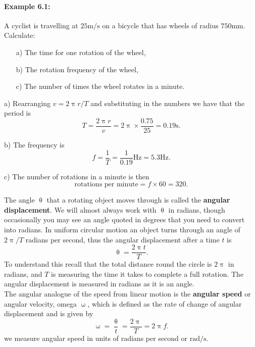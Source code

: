 \documentclass[a4paper,12pt]{book}
\begin{document}
\paragraph{Example 6.1:} A cyclist is travelling at $25\text{m/s}$ on a bicycle that has wheels of radius $750 \text{mm}$. Calculate:
\begin{itemize}
\setlength{\itemsep}{-5pt}
    \item[a)] The time for one rotation of the wheel,
    \item[b)] The rotation frequency of the wheel,
    \item[c)] The number of times the wheel rotates in a minute.
\end{itemize} 

a) Rearranging $v=2\uppi r/T$ and substituting in the numbers we have that the period is
\begin{equation*}
T=\frac{2\uppi r}{v}=2\uppi\times \frac{0.75}{25}=0.19\text{s}.
\end{equation*} 

b) The frequency is 
\begin{equation*}
f=\frac{1}{T}=\frac{1}{0.19}\text{Hz}=5.3\text{Hz}.
\end{equation*}

c) The number of rotations in a minute is then
\begin{equation*}
\text{rotations per minute} = f\times 60=320.
\end{equation*}

The angle $\uptheta$ that a rotating object moves through is called the \textbf{angular displacement}. We will almost always work with $\uptheta$ in radians, though occasionally you may see an angle quoted in degrees that you need to convert into radians. In uniform circular motion an object turns through an angle of $2\uppi/T$ radians per second, thus the angular displacement after a time $t$ is
\begin{equation}
\uptheta=\frac{2\uppi t}{T}.
\end{equation}
To understand this recall that the total distance round the circle is $2\uppi$ in radians, and $T$ is measuring the time it takes to complete a full rotation. The angular displacement is measured in radians as it is an angle. \\

The angular analogue of the speed from linear motion is the \textbf{angular speed} or angular velocity, omega  $\upomega$, which is defined as the rate of change of angular displacement and is given by
\begin{equation}
\upomega=\frac{\uptheta}{t}=\frac{2\uppi}{T}=2\uppi f.
\end{equation}
we measure angular speed in units of radians per second or $\text{rad/s}$. 
\end{document}
